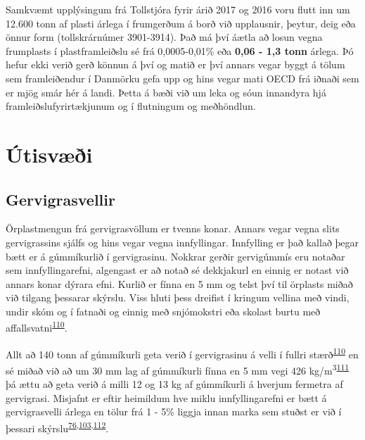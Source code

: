 \documentclass[icelandic,]{book}
\begin{document}
Samkvæmt upplýsingum frá Tollstjóra fyrir árið 2017 og 2016 voru flutt inn um 12.600 tonn af plasti árlega í frumgerðum á borð við upplausnir, þeytur, deig eða önnur form (tollskrárnúmer 3901-3914). Það má því áætla að losun vegna frumplasts í plastframleiðslu sé frá 0,0005-0,01\% eða \textbf{0,06 - 1,3 tonn} árlega. Þó hefur ekki verið gerð könnun á því og matið er því annars vegar byggt á tölum sem framleiðendur í Danmörku gefa upp og hins vegar mati OECD frá iðnaði sem er mjög smár hér á landi. Þetta á bæði við um leka og sóun innandyra hjá framleiðslufyrirtækjunum og í flutningum og meðhöndlun.

\hypertarget{utisvi}{%
\section*{Útisvæði}\label{utisvi}}

\hypertarget{gervigrasvellir}{%
\subsection*{Gervigrasvellir}\label{gervigrasvellir}}

Örplastmengun frá gervigrasvöllum er tvenns konar. Annars vegar vegna slits gervigrassins sjálfs og hins vegar vegna innfyllingar. Innfylling er það kallað þegar bætt er á gúmmíkurlið í gervigrasinu. Nokkrar gerðir gervigúmmís eru notaðar sem innfyllingarefni, algengast er að notað sé dekkjakurl en einnig er notast við annars konar dýrara efni. Kurlið er fínna en 5 mm og telst því til örplasts miðað við tilgang þessarar skýrslu. Viss hluti þess dreifist í kringum vellina með vindi, undir skóm og í fatnaði og einnig með snjómokstri eða skolast burtu með affallsvatni\textsuperscript{\protect\hyperlink{ref-Wredh2014}{110}}.

Allt að 140 tonn af gúmmíkurli geta verið í gervigrasinu á velli í fullri stærð\textsuperscript{\protect\hyperlink{ref-Wredh2014}{110}} en sé miðað við að um 30 mm lag af gúmmíkurli fínna en 5 mm vegi 426 kg/m\textsuperscript{3}\textsuperscript{\protect\hyperlink{ref-Gamalath2016}{111}} þá ættu að geta verið á milli 12 og 13 kg af gúmmíkurli á hverjum fermetra af gervigrasi. Misjafnt er eftir heimildum hve miklu innfyllingarefni er bætt á gervigrasvelli árlega en tölur frá 1 - 5\% liggja innan marka sem stuðst er við í þessari skýrslu\textsuperscript{\protect\hyperlink{ref-lassen2015microplastics}{76},\protect\hyperlink{ref-Hann2018}{103},\protect\hyperlink{ref-magnusson2016swedish}{112}}.
\end{document}
